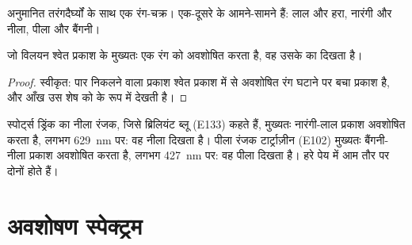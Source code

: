 \begin{omfigure}

{\small अनुमानित तरंगदैर्घ्यों के साथ एक रंग-चक्र।  एक-दूसरे के
आमने-सामने हैं: लाल और हरा, नारंगी और नीला, पीला और
बैंगनी।}
\end{omfigure}

\begin{proposition}[दिखने वाला रंग]\label{prop:g11:absorbance:colour-seen}
जो विलयन श्वेत प्रकाश के मुख्यतः एक रंग को अवशोषित करता है, वह उसके  का दिखता है।
\end{proposition}

\begin{proof}
स्वीकृत: पार निकलने वाला प्रकाश श्वेत प्रकाश में से अवशोषित रंग घटाने पर बचा प्रकाश
है, और आँख उस शेष को  के रूप में देखती है।
\end{proof}

\begin{example}[दो खाद्य रंजक]\label{ex:g11:absorbance:dyes}
स्पोर्ट्स ड्रिंक का नीला रंजक, जिसे ब्रिलियंट ब्लू (E133) कहते हैं,
मुख्यतः नारंगी-लाल प्रकाश अवशोषित करता है, लगभग \qty{629}{nm} पर: वह नीला दिखता है।
पीला रंजक टार्ट्राज़ीन (E102) मुख्यतः बैंगनी-नीला प्रकाश अवशोषित करता है, लगभग
\qty{427}{nm} पर: वह पीला दिखता है। हरे पेय में आम तौर पर दोनों होते हैं।
\end{example}

\section{अवशोषण स्पेक्ट्रम}

